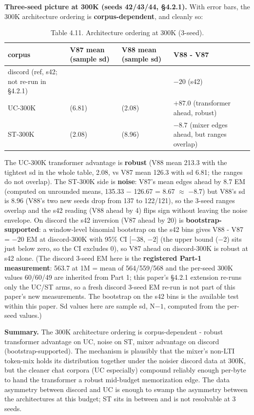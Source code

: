 \documentclass[11pt]{article}
\begin{document}
\textbf{Three-seed picture at 300K (seeds 42/43/44, \S4.2.1).} With error bars, the 300K architecture ordering is \textbf{corpus-dependent}, and cleanly so:

\begin{table}[!t]
\centering
\small
\caption*{Table 4.11. Architecture ordering at 300K (3-seed).}
\begin{tabular}{p{3.4cm}>{\centering\arraybackslash}p{3.0cm}>{\centering\arraybackslash}p{3.0cm}>{\raggedright\arraybackslash}p{4.4cm}}
\toprule
corpus & V87 mean (sample sd) & V88 mean (sample sd) & V88 - V87 \\
\midrule
discord (ref, s42; not re-run in \S4.2.1) & 60 & 40 & $-20$ (s42) \\
UC-300K  & 126.3 (6.81) & 213.3 (2.08) & $+87.0$ (transformer ahead, robust) \\
ST-300K  & 135.3 (2.08) & 126.7 (8.96) & $-8.7$ (mixer edges ahead, but ranges overlap) \\
\bottomrule
\end{tabular}
\end{table}

The UC-300K transformer advantage is \textbf{robust} (V88 mean 213.3 with the tightest sd in the whole table, 2.08, vs V87 mean 126.3 with sd 6.81; the ranges do not overlap). The ST-300K side is \textbf{noise}: V87's mean edges ahead by 8.7 EM (computed on unrounded means, 135.33 $-$ 126.67 = 8.67 $\approx$ $-8.7$) but V88's sd is 8.96 (V88's two new seeds drop from 137 to 122/121), so the 3-seed ranges overlap and the s42 reading (V88 ahead by 4) flips sign without leaving the noise envelope. On discord the s42 inversion (V87 ahead by 20) is \textbf{bootstrap-supported}: a window-level binomial bootstrap on the s42 bins gives V88 - V87 = $-20$ EM at discord-300K with 95\% CI [$-38$, $-2$] (the upper bound ($-2$) sits just below zero, so the CI excludes 0), so V87 ahead on discord-300K is robust at s42 alone. (The discord 3-seed EM here is the \textbf{registered Part-1 measurement}: 563.7 at 1M = mean of 564/559/568 and the per-seed 300K values 60/60/49 are inherited from Part 1; this paper's \S4.2.1 extension re-runs only the UC/ST arms, so a fresh discord 3-seed EM re-run is not part of this paper's new measurements. The bootstrap on the s42 bins is the available test within this paper. Sd values here are sample sd, N$-1$, computed from the per-seed values.)

\textbf{Summary.} The 300K architecture ordering is corpus-dependent - robust transformer advantage on UC, noise on ST, mixer advantage on discord (bootstrap-supported). The mechanism is plausibly that the mixer's non-LTI token-mix holds its distribution together under the noisier discord data at 300K, but the cleaner chat corpora (UC especially) compound reliably enough per-byte to hand the transformer a robust mid-budget memorization edge. The data asymmetry between discord and UC is enough to swamp the asymmetry between the architectures at this budget; ST sits in between and is not resolvable at 3 seeds.
\end{document}

